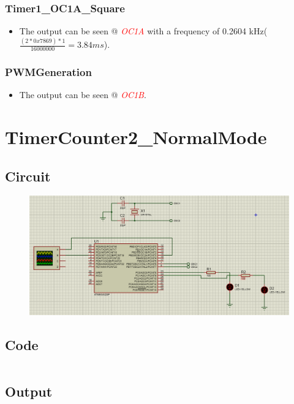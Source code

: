 \documentclass[oneside]{book}
\newcommand{\pinFormat}[1]{\emph{\textcolor{red}{#1}}}
\begin{document}
\subsubsection{Timer1\_OC1A\_Square}
\begin{itemize}
    \item The output can be seen @ \pinFormat{OC1A} with a frequency of 0.2604 kHz($\frac{(2*0x7869) * 1}{16000000} = 3.84 ms$).
\end{itemize}
\subsubsection{PWMGeneration}
\begin{itemize}
    \item The output can be seen @ \pinFormat{OC1B}.
\end{itemize}






\section{TimerCounter2\_NormalMode}
\subsection{Circuit}
\begin{figure}[H]
    \centering
    \includegraphics[height=0.2\textheight]{TimerCounter2_NormalMode.png}
\end{figure}
\subsection{Code}
\inputminted[breaklines, bgcolor=black]{c}{../programFiles/TimerCounter2_NormalMode.c}
\subsection{Output}
\end{document}
